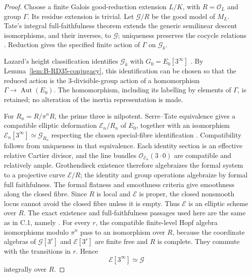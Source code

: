 \begin{proof}
Choose a finite Galois good-reduction extension $L/K$, with
$R=\mathcal O_L$ and group $\Gamma$. Its residue extension is
trivial. Let $\mathcal G/R$ be the good model of $M_L$.
Tate's integral full-faithfulness theorem extends the generic
semilinear descent isomorphisms, and their inverses, to
$\mathcal G$; uniqueness preserves the cocycle relations
\cite[Theorem~4 and Corollaries~1--2, p.~181]{Tate1967PDivisible}.
Reduction gives the specified finite action of $\Gamma$ on
$\mathcal G_k$.

Lazard's height classification identifies $\mathcal G_k$ with
$G_0=E_0[3^\infty]$
\cite[Theorem~IV and its proof, pp.~270--271]{Lazard1955Formal}.
By Lemma~\ref{lem:B-RD35-conjugacy}, this identification can be
chosen so that the reduced action is the $3$-divisible-group action
of a homomorphism $\Gamma\to\operatorname{Aut}(E_0)$.
The homomorphism, including its labelling by elements of $\Gamma$,
is retained; no alteration of the inertia representation is made.

For $R_n=R/\pi^nR$, the prime three is nilpotent. Serre--Tate
equivalence gives a compatible elliptic deformation $\mathcal E_n/R_n$
of $E_0$, together with an isomorphism
$\mathcal E_n[3^\infty]\simeq\mathcal G_{R_n}$ respecting the
chosen special-fibre identification
\cite[Theorem~1.2.1, printed p.~143]{Katz1981SerreTate}.
Compatibility follows from uniqueness in that equivalence.
Each identity section is an effective relative Cartier divisor,
and the line bundles $\mathcal O_{\mathcal E_n}(3\cdot0)$ are
compatible and relatively ample. Grothendieck existence therefore
algebraizes the formal system to a projective curve
$\mathcal E/R$; the identity and group operations algebraize by
formal full faithfulness. The formal flatness and smoothness
criteria give smoothness along the closed fibre. Since $R$ is
local and $\mathcal E$ is proper, the closed nonsmooth locus
cannot avoid the closed fibre unless it is empty. Thus
$\mathcal E$ is an elliptic scheme over $R$. The exact existence
and full-faithfulness passages used here are the same as in C.1,
namely \cite[Theorems~5.4.1 and~5.4.5]{EGAIII1}.
For every $r$, the compatible finite-level Hopf algebra
isomorphisms modulo $\pi^n$ pass to an isomorphism over $R$,
because the coordinate algebras of $\mathcal G[3^r]$ and
$\mathcal E[3^r]$ are finite free and $R$ is complete.
They commute with the transitions in $r$. Hence
\[
                    \mathcal E[3^\infty]\simeq\mathcal G
                                                        \tag{B-RD35.4}
\]
integrally over $R$.


\end{proof}
